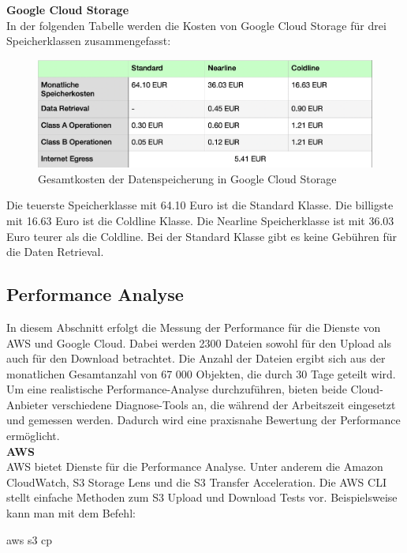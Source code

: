 \textbf{Google Cloud Storage}\\

In der folgenden Tabelle werden die Kosten von Google Cloud Storage für drei Speicherklassen zusammengefasst:

\begin{figure}[h]
\centering
	\includegraphics[width=12cm,keepaspectratio]{Pictures/GCKostenOhneGesamt.png}
	\caption{Gesamtkosten der Datenspeicherung in Google Cloud Storage}
\end{figure}

Die teuerste Speicherklasse mit 64.10 Euro ist die Standard Klasse. Die billigste mit 16.63 Euro ist die Coldline Klasse. Die Nearline Speicherklasse ist mit 36.03 Euro teurer als die Coldline. Bei der Standard Klasse gibt es keine Gebühren für die Daten Retrieval.

\newpage

\subsection{Performance Analyse}

In diesem Abschnitt erfolgt die Messung der Performance für die Dienste von AWS und Google Cloud. Dabei werden 2300 Dateien sowohl für den Upload als auch für den Download betrachtet. Die Anzahl der Dateien ergibt sich aus der monatlichen Gesamtanzahl von 67 000 Objekten, die durch 30 Tage geteilt wird. Um eine realistische Performance-Analyse durchzuführen, bieten beide Cloud-Anbieter verschiedene Diagnose-Tools an, die während der Arbeitszeit eingesetzt und gemessen werden. Dadurch wird eine praxisnahe Bewertung der Performance ermöglicht.\\

\textbf{AWS}\\

AWS bietet Dienste für die Performance Analyse. Unter anderem die Amazon CloudWatch, S3 Storage Lens und die S3 Transfer Acceleration. Die AWS CLI stellt einfache Methoden zum S3 Upload und Download Tests vor. Beispielsweise kann man mit dem Befehl:

\begin{code} aws s3 cp \end{code}

